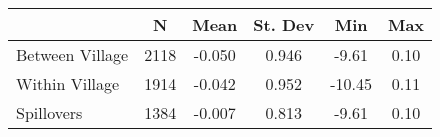 \begin{tabular}{l*{5}{c}}\hline&\multicolumn{1}{c}{N}&\multicolumn{1}{c}{Mean}&\multicolumn{1}{c}{St. Dev}&\multicolumn{1}{c}{Min}&\multicolumn{1}{c}{Max}\\ \hline 
Between Village & 2118 & -0.050 & 0.946 & -9.61 & 0.10 \\
Within Village & 1914 & -0.042 & 0.952 & -10.45 & 0.11 \\
Spillovers & 1384 & -0.007 & 0.813 & -9.61 & 0.10 \\
\hline \end{tabular}
